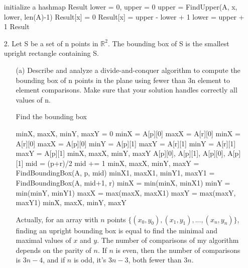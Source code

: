 \documentclass{article}       %
\begin{document}
\begin{enumerate}
\begin{algorithm}[H]
\begin{algorithmic}[1]
			\State initialize a hashmap Result
			\State lower = 0, upper = 0
			\State 	upper = FindUpper(A, x, lower, len(A)-1)
			\State Result[x] = 0
			\Else
			\State Result[x] = upper - lower + 1
			\State lower = upper + 1
			\EndIf
			\EndFor
			\State \Return Result
			\EndProcedure
		\end{algorithmic}\label{p1}
	\end{algorithm}
	\item[2.] Let S be a set of n points in ${\mathbb{R}}^2$. The bounding box of S is the smallest upright rectangle containing S.\newline
	\begin{enumerate}
		\item[(a)] Describe and analyze a divide-and-conquer algorithm to compute the bounding box of n points in the plane using fewer than 3n element to element comparisons. Make sure that your solution handles correctly all values of n.\newline
		\begin{algorithm}[H]
			\caption{Find the bounding box}
			\small
			\begin{algorithmic}[1]
				\State minX, maxX, minY, maxY = 0
				\State minX = A[p][0]
				\State maxX = A[r][0]
				\Else
				\State minX = A[r][0]
				\State maxX = A[p][0]
				\EndIf
				\State minY = A[p][1]
				\State maxY = A[r][1]
				\Else
				\State minY = A[r][1]
				\State maxY = A[p][1]
				\EndIf
				\State \Return minX, maxX, minY, maxY
				\EndIf
				\State \Return A[p][0], A[p][1], A[p][0], A[p][1]
				\EndIf
				\State mid = (p+r)/2
				\State mid += 1
				\EndIf
				\State minX, maxX, minY, maxY = FindBoundingBox(A, p, mid)
				\State  minX1, maxX1, minY1, maxY1 = FindBoundingBox(A, mid+1, r)
				\State minX = min(minX, minX1)
				\State minY = min(minY, minY1)
				\State maxX = max(maxX, maxX1)
				\State maxY = max(maxY, maxY1)
				\State \Return minX, maxX, minY, maxY
				\EndProcedure
			\end{algorithmic}\label{p2}
		\end{algorithm}
		Actually, for an array with $n$ points $\{(x_0, y_0), (x_1, y_1), ..., (x_n, y_n)\}$, finding an upright bounding box is equal to find the minimal and maximal values of $x$ and $y$.\newline
		The number of comparisons of my algorithm depends on the parity of $n$. If $n$ is even, then the number of comparisons is $3n - 4$, and if $n$ is odd, it's $3n - 3$, both fewer than $3n$.\newline

\end{enumerate}
\end{enumerate}
\end{document}
